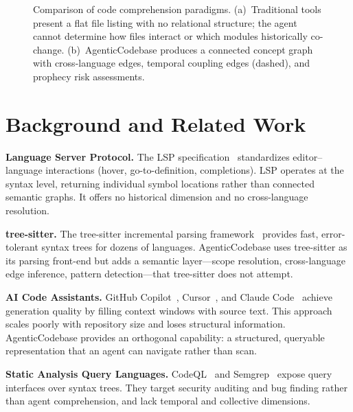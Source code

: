\documentclass[10pt, twocolumn]{article}
\begin{document}
\begin{figure}[t]
\caption{Comparison of code comprehension paradigms. (a)~Traditional tools present a flat file listing with no relational structure; the agent cannot determine how files interact or which modules historically co-change. (b)~AgenticCodebase produces a connected concept graph with cross-language edges, temporal coupling edges (dashed), and prophecy risk assessments.}
\label{fig:comparison}
\end{figure}


\section{Background and Related Work}
\label{sec:related}

\textbf{Language Server Protocol.} The LSP specification~\cite{lsp2024} standardizes editor--language interactions (hover, go-to-definition, completions). LSP operates at the syntax level, returning individual symbol locations rather than connected semantic graphs. It offers no historical dimension and no cross-language resolution.

\textbf{tree-sitter.} The tree-sitter incremental parsing framework~\cite{treesitter2018} provides fast, error-tolerant syntax trees for dozens of languages. AgenticCodebase uses tree-sitter as its parsing front-end but adds a semantic layer---scope resolution, cross-language edge inference, pattern detection---that tree-sitter does not attempt.

\textbf{AI Code Assistants.} GitHub Copilot~\cite{copilot2021}, Cursor~\cite{cursor2024}, and Claude Code~\cite{claudecode2025} achieve generation quality by filling context windows with source text. This approach scales poorly with repository size and loses structural information. AgenticCodebase provides an orthogonal capability: a structured, queryable representation that an agent can navigate rather than scan.

\textbf{Static Analysis Query Languages.} CodeQL~\cite{codeql2016} and Semgrep~\cite{semgrep2020} expose query interfaces over syntax trees. They target security auditing and bug finding rather than agent comprehension, and lack temporal and collective dimensions.
\end{document}
